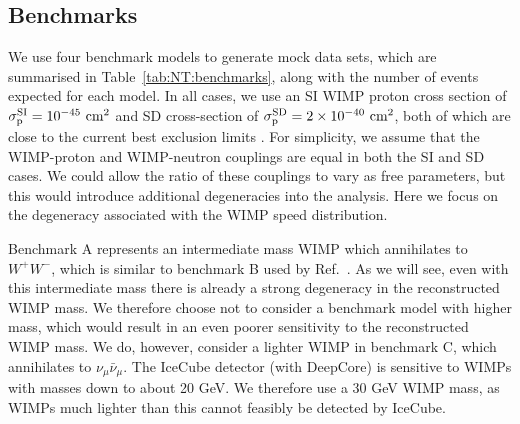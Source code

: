 \subsection{Benchmarks}
\label{sec:NT:benchmarks}
We use four benchmark models to generate mock data sets, which are summarised in Table~\ref{tab:NT:benchmarks}, along with the number of events expected for each model. In all cases, we use an SI WIMP proton cross section of $\sigmapsi = 10^{-45} \textrm{ cm}^2$ and SD cross-section of $\sigmapsd = 2 \times 10^{-40} \textrm{ cm}^2$, both of which are close to the current best exclusion limits \cite{Akerib:2014, Aprile:2013c}. For simplicity, we assume that the WIMP-proton and WIMP-neutron couplings are equal in both the SI and SD cases. We could allow the ratio of these couplings to vary as free parameters, but this would introduce additional degeneracies into the analysis. Here we focus on the degeneracy associated with the WIMP speed distribution.

Benchmark A represents an intermediate mass WIMP which annihilates to $W^{+}W^{-}$, which is similar to benchmark B used by Ref.~\cite{Arina:2013}. As we will see, even with this intermediate mass there is already a strong degeneracy in the reconstructed WIMP mass. We therefore choose not to consider a benchmark model with higher mass, which would result in an even poorer sensitivity to the reconstructed WIMP mass. We do, however, consider a lighter WIMP in benchmark C, which annihilates to $\nu_\mu \bar{\nu}_\mu$. The IceCube detector (with DeepCore) is sensitive to WIMPs with masses down to about 20 GeV. We therefore use a 30 GeV WIMP mass, as WIMPs much lighter than this cannot feasibly be detected by IceCube.

